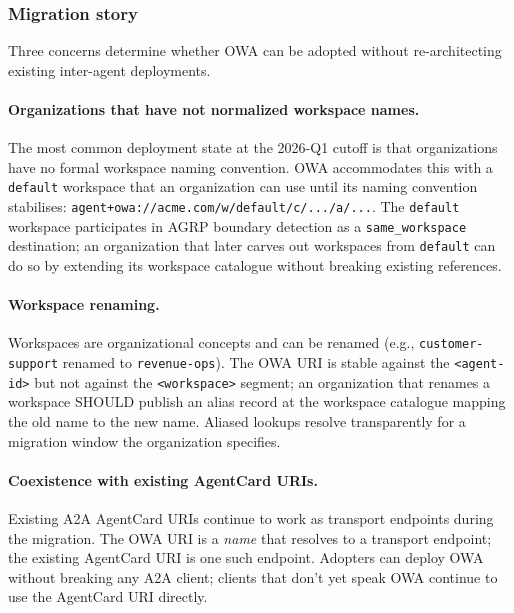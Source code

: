 \subsubsection{Migration story}
\label{sec:proposals:owa:migration}

Three concerns determine whether OWA can be adopted
without re-architecting existing inter-agent deployments.

\paragraph{Organizations that have not normalized workspace names.}
The most common deployment state at the 2026-Q1 cutoff
is that organizations have no formal workspace
naming convention. OWA accommodates this with a
\texttt{default} workspace that an organization can use
until its naming convention stabilises:
\texttt{agent+owa://acme.com/w/default/c/.../a/...}. The
\texttt{default} workspace participates in AGRP
boundary detection as a \texttt{same\_workspace} destination; an
organization that later carves out workspaces from
\texttt{default} can do so by extending its workspace
catalogue without breaking existing references.

\paragraph{Workspace renaming.}
Workspaces are organizational concepts and can be
renamed (e.g., \texttt{customer-support} renamed to
\texttt{revenue-ops}). The OWA URI is stable against the
\texttt{<agent-id>} but not against the
\texttt{<workspace>} segment; an organization that
renames a workspace SHOULD publish an alias record at
the workspace catalogue mapping the old name to the new
name. Aliased lookups resolve transparently for a
migration window the organization specifies.

\paragraph{Coexistence with existing AgentCard URIs.}
Existing A2A AgentCard URIs continue to work as transport
endpoints during the migration. The OWA URI is a
\emph{name} that resolves to a transport endpoint; the
existing AgentCard URI is one such endpoint. Adopters
can deploy OWA without breaking any A2A client; clients
that don't yet speak OWA continue to use the AgentCard
URI directly.


